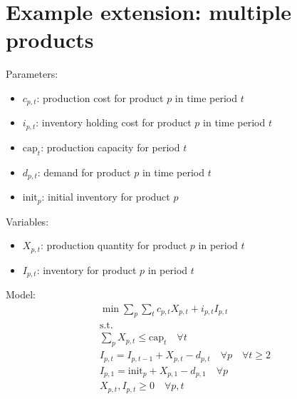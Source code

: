 \documentclass[10pt]{article}
\begin{document}
\section{Example extension: multiple products}
Parameters: 
\begin{itemize}
    \item $c_{p, t} $: production cost for product $p $ in time period $t $
    \item $i_{p, t} $: inventory holding cost for product $p $ in time period $t $
    \item $\text{cap}_t $: production capacity for period $ t $
    \item $d_{p, t} $: demand for product $p $ in time period $t $
    \item $\text{init}_p $: initial inventory for product $p $
\end{itemize}
Variables: 
\begin{itemize}
    \item $X_{p, t} $: production quantity for product $p $ in period $t $
    \item $I_{p, t} $: inventory for product $p $ in period $t $
\end{itemize}
Model: 
\begin{gather*}
    \min \sum_p\sum_tc_{p, t}X_{p, t} + i_{p, t}I_{p, t}\\
    \text{s.t.}\\
    \sum_pX_{p, t}\le\text{cap}_t\quad\forall t\\
    I_{p, t} = I_{p, t - 1} + X_{p, t} - d_{p, t}\quad\forall p\quad\forall t\ge 2\\
    I_{p, 1} = \text{init}_p + X_{p, 1} - d_{p, 1}\quad\forall p\\
    X_{p, t}, I_{p, t}\ge 0\quad\forall p, t
\end{gather*}
\newpage 
\end{document}
